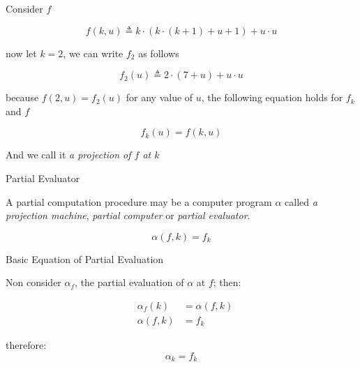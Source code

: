 \documentclass[aspectratio=169]{beamer}
\begin{document}
\begin{frame}
Consider $f$

    \[
        f(k,u) \triangleq k \cdot ( k \cdot (k+1) + u + 1) + u\cdot u
    \]

now let $k=2$, we can write $f_2$ as follows

    \[
        f_2(u) \triangleq 2 \cdot (7+u) + u\cdot u    
    \]

because $f(2,u) = f_2(u)$ for any value of $u$, 
the following equation holds for $f_k$ and $f$



    \begin{equation}
        f_k(u)=f(k,u)
    \end{equation}

And we call it \textit{a projection of $f$ at $k$}

\end{frame}

\begin{frame}{Partial Evaluator}

A partial computation procedure may be a computer program $\alpha$
called \textit{a projection machine}, \textit{partial computer} 
or \textit{partial evaluator}.

\begin{equation}
    \alpha(f,k) = f_k
\end{equation}
\end{frame}


\begin{frame}{Basic Equation of Partial Evaluation}

Non consider $\alpha_f$, the partial evaluation of $\alpha$ at $f$; then:

\begin{eqnarray*}
            &\alpha_f(k) &= \alpha(f,k)\\
            &\alpha(f,k) &= f_k
\end{eqnarray*}

therefore:
\begin{equation}
       \alpha_k =f_k 
\end{equation}
\end{frame}
\end{document}
